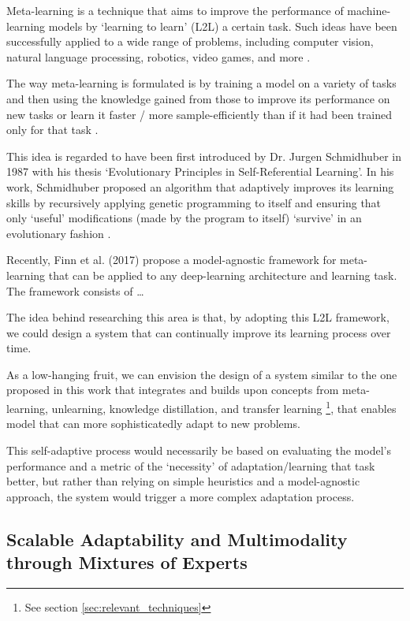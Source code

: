 \documentclass[../main.tex]{subfiles}
\begin{document}
    Meta-learning is a technique that aims to improve the performance of machine-learning models by `learning to learn' (L2L) a certain task. Such ideas have been successfully applied to a wide range of problems, including computer vision, natural language processing, robotics, video games, and more \cite{hospedales_meta-learning_2020}.
    
    The way meta-learning is formulated is by training a model on a variety of tasks and then using the knowledge gained from those to improve its performance on new tasks or learn it faster / more sample-efficiently than if it had been trained only for that task \cite{hospedales_meta-learning_2020}.
    
    This idea is regarded to have been first introduced by Dr. Jurgen Schmidhuber in 1987 with his thesis `Evolutionary Principles in Self-Referential Learning'. In his work, Schmidhuber proposed an algorithm that adaptively improves its learning skills by recursively applying genetic programming to itself and ensuring that only `useful' modifications (made by the program to itself) `survive' in an evolutionary fashion \cite{schmidhuber_evolutionary_1987}.
    
    Recently, Finn et al. (2017) \cite{finn_model-agnostic_2017} propose a model-agnostic framework for meta-learning that can be applied to any deep-learning architecture and learning task. The framework consists of \dots

    The idea behind researching this area is that, by adopting this L2L framework, we could design a system that can continually improve its learning process over time.

    As a low-hanging fruit, we can envision the design of a system similar to the one proposed in this work that integrates and builds upon concepts from meta-learning, unlearning, knowledge distillation, and transfer learning \footnote{See section \ref{sec:relevant_techniques}}, that enables model that can more sophisticatedly adapt to new problems. 
    
    This self-adaptive process would necessarily be based on evaluating the model's performance and a metric of the `necessity' of adaptation/learning that task better, but rather than relying on simple heuristics and a model-agnostic approach, the system would trigger a more complex adaptation process.

    \clearpage

    \subsection{Scalable Adaptability and Multimodality through Mixtures of Experts} \label{conclusions:research_directions:moes} 
\end{document}
